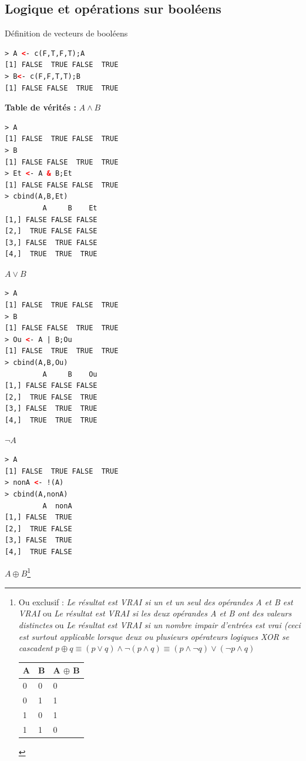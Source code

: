\subsection{Logique et opérations sur booléens}

Définition de vecteurs de booléens
\begin{lstlisting}[language=html]
> A <- c(F,T,F,T);A
[1] FALSE  TRUE FALSE  TRUE
> B<- c(F,F,T,T);B
[1] FALSE FALSE  TRUE  TRUE
\end{lstlisting}

\textbf{Table de vérités :}\newline
$A\land B$
\begin{lstlisting}[language=html]
> A
[1] FALSE  TRUE FALSE  TRUE
> B
[1] FALSE FALSE  TRUE  TRUE
> Et <- A & B;Et
[1] FALSE FALSE FALSE  TRUE
> cbind(A,B,Et)
         A     B    Et
[1,] FALSE FALSE FALSE
[2,]  TRUE FALSE FALSE
[3,] FALSE  TRUE FALSE
[4,]  TRUE  TRUE  TRUE
\end{lstlisting}
$A \lor B$
\begin{lstlisting}[language=html]
> A
[1] FALSE  TRUE FALSE  TRUE
> B
[1] FALSE FALSE  TRUE  TRUE
> Ou <- A | B;Ou
[1] FALSE  TRUE  TRUE  TRUE
> cbind(A,B,Ou)
         A     B    Ou
[1,] FALSE FALSE FALSE
[2,]  TRUE FALSE  TRUE
[3,] FALSE  TRUE  TRUE
[4,]  TRUE  TRUE  TRUE
\end{lstlisting}
$\lnot A$
\begin{lstlisting}[language=html]
> A
[1] FALSE  TRUE FALSE  TRUE
> nonA <- !(A)
> cbind(A,nonA)
         A  nonA
[1,] FALSE  TRUE
[2,]  TRUE FALSE
[3,] FALSE  TRUE
[4,]  TRUE FALSE
\end{lstlisting}
$A \oplus B$\footnote{Ou exclusif : \textit{Le résultat est VRAI si un et un seul des opérandes A et B est VRAI} ou \textit{Le résultat est VRAI si les deux opérandes A et B ont des valeurs distinctes} ou \textit{Le résultat est VRAI si un nombre impair d'entrées est vrai (ceci est surtout applicable lorsque deux ou plusieurs opérateurs logiques XOR se cascadent } \newline
$ p \oplus q \equiv (p\lor q )\land \lnot (p\land q) \equiv (p\land \lnot q)\lor(\lnot p \land q)$
\begin{center}
\begin{tabular}{|l|l|l|}
\hline
A & B & A $\oplus$ B \\ \hline
0 & 0 & 0          \\ \hline
0 & 1 & 1          \\ \hline
1 & 0 & 1          \\ \hline
1 & 1 & 0          \\ \hline
\end{tabular}
\end{center}
}

